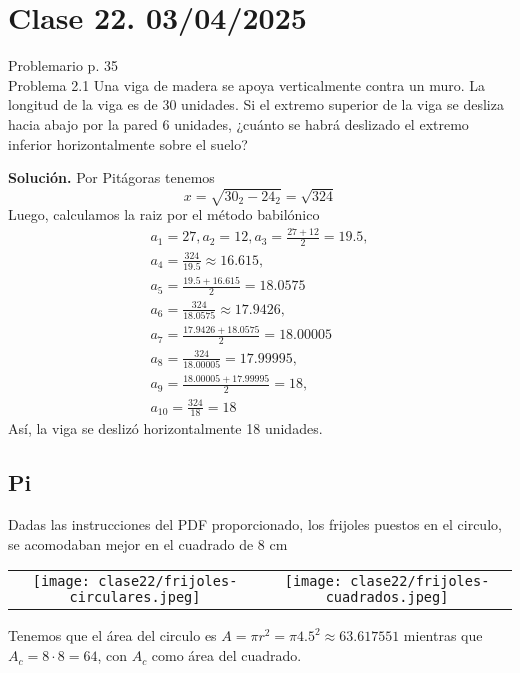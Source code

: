\section{Clase 22. 03/04/2025}
Problemario p. 35\\
Problema 2.1 Una viga de madera se apoya verticalmente contra un muro. La longitud de la viga es de 30 unidades. Si el extremo superior de la viga se desliza hacia abajo por la pared 6 unidades, ¿cuánto se habrá deslizado el extremo inferior horizontalmente sobre el suelo?
\par
\begin{minipage}[t]{0.66\textwidth}
\textbf{Solución.} 
Por Pitágoras tenemos
$$x=\sqrt{30_{2} - 24_{2}} = \sqrt{324}$$
Luego, calculamos la raiz por el método babilónico
 \begin{gather*}
    a_{1} = 27, a_{2} = 12, a_{3} = \frac{27+12}{2} = 19.5,\\ 
    a_{4} = \frac{324}{19.5} \approx 16.615, \\
    a_{5} = \frac{19.5+16.615}{2} = 18.0575\\
    a_{6} = \frac{324}{18.0575} \approx 17.9426,\\
    a_{7} = \frac{17.9426+18.0575}{2} = 18.00005\\
    a_{8} = \frac{324}{18.00005} = 17.99995,\\
    a_{9} = \frac{18.00005+17.99995}{2} = 18, \\
    a_{10} = \frac{324}{18} = 18
 \end{gather*}
Así, la viga se deslizó horizontalmente 18 unidades.
\end{minipage}
\begin{minipage}[t]{0.3\textwidth}
    \centering
    
\end{minipage}
\par
\subsection{Pi}
Dadas las instrucciones del PDF proporcionado, los frijoles puestos en el circulo, se acomodaban mejor en el cuadrado de 8 cm
\begin{center}
    \begin{tabular}{cc}
        \texttt{[image: clase22/frijoles-circulares.jpeg]} & \texttt{[image: clase22/frijoles-cuadrados.jpeg]}
    \end{tabular}
\end{center}
Tenemos que el área del circulo es $A=\pi r^{2} = \pi 4.5^{2} \approx 63.617551$ mientras que $A_{c} = 8\cdot8 = 64$, con $A_{c}$ como área del cuadrado.\\

